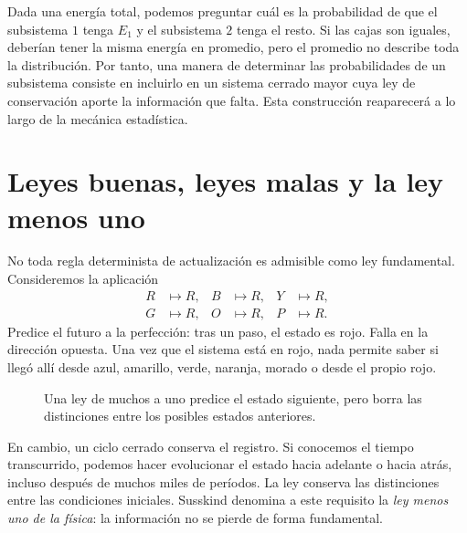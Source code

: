 Dada una energía total, podemos preguntar cuál es la probabilidad de que el subsistema \(1\) tenga \(E_1\) y el subsistema \(2\) tenga el resto. Si las cajas son iguales, deberían tener la misma energía en promedio, pero el promedio no describe toda la distribución. Por tanto, una manera de determinar las probabilidades de un subsistema consiste en incluirlo en un sistema cerrado mayor cuya ley de conservación aporte la información que falta. Esta construcción reaparecerá a lo largo de la mecánica estadística.

\section{Leyes buenas, leyes malas y la ley menos uno}

No toda regla determinista de actualización es admisible como ley fundamental. Consideremos la aplicación
\begin{equation}
 \begin{aligned}
 R&\mapsto R,& B&\mapsto R,& Y&\mapsto R,\\
 G&\mapsto R,& O&\mapsto R,& P&\mapsto R.
 \end{aligned}
 \label{eq:sm1-all-to-red}
\end{equation}
Predice el futuro a la perfección: tras un paso, el estado es rojo. Falla en la dirección opuesta. Una vez que el sistema está en rojo, nada permite saber si llegó allí desde azul, amarillo, verde, naranja, morado o desde el propio rojo.

\begin{figure}[htbp]
\centering
{}
\caption{Una ley de muchos a uno predice el estado siguiente, pero borra las distinciones entre los posibles estados anteriores.}
\label{fig:sm1-bad-law}
\end{figure}

En cambio, un ciclo cerrado conserva el registro. Si conocemos el tiempo transcurrido, podemos hacer evolucionar el estado hacia adelante o hacia atrás, incluso después de muchos miles de períodos. La ley conserva las distinciones entre las condiciones iniciales. Susskind denomina a este requisito la \emph{ley menos uno de la física}: la información no se pierde de forma fundamental.

